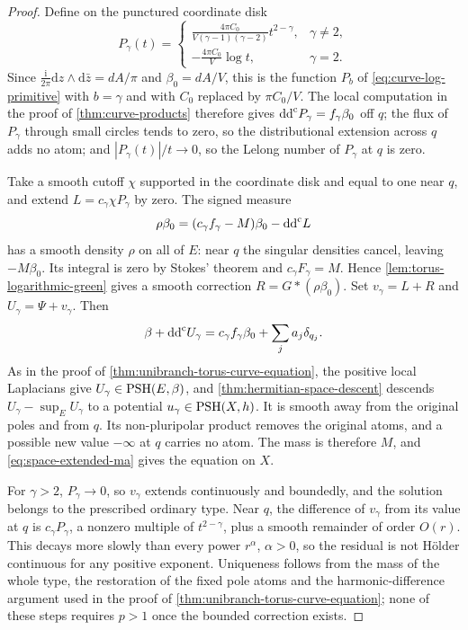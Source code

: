 \begin{proof}
Define on the punctured coordinate disk
\begin{equation}\label{eq:unibranch-density-primitive}
 P_\gamma(t)=
 \begin{cases}
 \displaystyle\frac{4\pi C_0}{V(\gamma-1)(\gamma-2)}
                         t^{2-\gamma},&\gamma\ne2,\\[4pt]
 \displaystyle-\frac{4\pi C_0}{V}\log t,&\gamma=2.
 \end{cases}
\end{equation}
Since $\frac{\mathrm i}{2\pi}\mathrm dz\wedge\mathrm d\bar z=dA/\pi$ and $\beta_0=dA/V$, this is the function $P_b$ of \eqref{eq:curve-log-primitive} with $b=\gamma$ and with $C_0$ replaced by $\pi C_0/V$. The local computation in the proof of \cref{thm:curve-products} therefore gives $\mathrm{dd}^{\mathrm{c}} P_\gamma=f_\gamma\beta_0$ off $q$; the flux of $P_\gamma$ through small circles tends to zero, so the distributional extension across $q$ adds no atom; and $|P_\gamma(t)|/t\to0$, so the Lelong number of $P_\gamma$ at $q$ is zero.

Take a smooth cutoff $\chi$ supported in the coordinate disk and equal to one near $q$, and extend $L=c_\gamma\chi P_\gamma$ by zero. The signed measure
\[
 \rho\beta_0=(c_\gamma f_\gamma-M)\beta_0-\mathrm{dd}^{\mathrm{c}} L
\]
has a smooth density $\rho$ on all of $E$: near $q$ the singular densities cancel, leaving $-M\beta_0$. Its integral is zero by Stokes' theorem and $c_\gamma F_\gamma=M$. Hence \cref{lem:torus-logarithmic-green} gives a smooth correction $R=G*(\rho\beta_0)$. Set $v_\gamma=L+R$ and $U_\gamma=\Psi+v_\gamma$. Then
\begin{equation}\label{eq:unibranch-density-current}
 \beta+\mathrm{dd}^{\mathrm{c}} U_\gamma
       =c_\gamma f_\gamma\beta_0+\sum_j a_j\delta_{q_j}.
\end{equation}
As in the proof of \cref{thm:unibranch-torus-curve-equation}, the positive local Laplacians give $U_\gamma\in\mathrm{PSH}(E,\beta)$, and \cref{thm:hermitian-space-descent} descends $U_\gamma-\sup_EU_\gamma$ to a potential $u_\gamma\in\mathrm{PSH}(X,h)$. It is smooth away from the original poles and from $q$. Its non-pluripolar product removes the original atoms, and a possible new value $-\infty$ at $q$ carries no atom. The mass is therefore $M$, and \eqref{eq:space-extended-ma} gives the equation on $X$.

For $\gamma>2$, $P_\gamma\to0$, so $v_\gamma$ extends continuously and boundedly, and the solution belongs to the prescribed ordinary type. Near $q$, the difference of $v_\gamma$ from its value at $q$ is $c_\gamma P_\gamma$, a nonzero multiple of $t^{2-\gamma}$, plus a smooth remainder of order $O(r)$. This decays more slowly than every power $r^\alpha$, $\alpha>0$, so the residual is not H\"older continuous for any positive exponent. Uniqueness follows from the mass of the whole type, the restoration of the fixed pole atoms and the harmonic-difference argument used in the proof of \cref{thm:unibranch-torus-curve-equation}; none of these steps requires $p>1$ once the bounded correction exists.


\end{proof}

